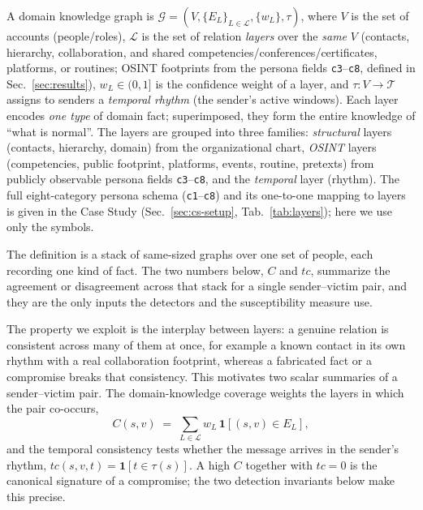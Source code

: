 \begin{definition}
\label{def:dkg}
A domain knowledge graph is $\mathcal{G}=(V,\{E_L\}_{L\in\mathcal{L}},\{w_L\},\tau)$, where $V$ is the set of
accounts (people/roles), $\mathcal{L}$ is the set of relation \emph{layers} over the \emph{same} $V$ (contacts,
hierarchy, collaboration, and shared competencies/conferences/certificates, platforms, or routines; OSINT
footprints from the persona fields \texttt{c3}--\texttt{c8}, defined in Sec.~\ref{sec:results}), $w_L\in(0,1]$ is the confidence weight of a layer, and
$\tau:V \to \mathcal{T}$ assigns to senders a \emph{temporal rhythm} (the sender's active windows).
Each layer encodes \emph{one type} of domain fact; superimposed, they form the entire knowledge of ``what is
normal''. The layers are grouped into three families: \emph{structural} layers (contacts, hierarchy, domain)
from the organizational chart, \emph{OSINT} layers (competencies, public footprint, platforms, events, routine,
pretexts) from publicly observable persona fields \texttt{c3}--\texttt{c8}, and the \emph{temporal} layer
(rhythm). The full eight-category persona schema (\texttt{c1}--\texttt{c8}) and its one-to-one mapping to
layers is given in the Case Study (Sec.~\ref{sec:cs-setup}, Tab.~\ref{tab:layers}); here we use only the
symbols.
\end{definition}

\noindent The definition is a stack of same-sized graphs over one set of people, each recording one
kind of fact. The two numbers below, $C$ and $tc$, summarize the agreement or disagreement across that
stack for a single sender--victim pair, and they are the only inputs the detectors and the susceptibility
measure use.

\noindent The property we exploit is the interplay between layers: a genuine relation is consistent across many of them at once, for example a known contact in its own rhythm with a real collaboration footprint, whereas a fabricated fact or a compromise breaks that consistency. This motivates two scalar summaries of a sender--victim pair. The
domain-knowledge coverage weights the layers in which the pair co-occurs,
\begin{equation}
C(s,v)\;=\;\sum_{L\in\mathcal{L}} w_L\,\mathbf{1}\!\left[(s,v)\in E_L\right],
\label{eq:consistency-model}
\end{equation}
and the temporal consistency tests whether the message arrives in the sender's rhythm,
$tc(s,v,t)=\mathbf{1}[t\in\tau(s)]$. A high $C$ together with $tc=0$ is the canonical signature of a compromise;
the two detection invariants below make this precise.

